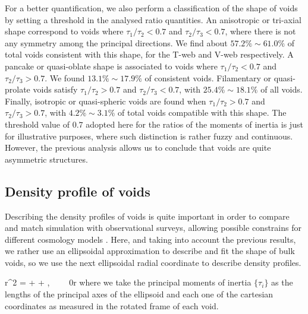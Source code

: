 \documentclass[a4,useAMS,usenatbib,usegraphicx]{latex/mn2e}
\begin{document}
For a better quantification, we also perform a classification of the shape 
of voids by setting a threshold in the analysed ratio quantities. An 
anisotropic or tri-axial shape correspond to voids where $\tau_1/\tau_2 < 
0.7$ and $\tau_2/\tau_3 < 0.7$, where there is not any symmetry among the
principal directions. We find about $57.2\% \sim 61.0\%$ of total voids 
consistent with this shape, for the T-web and V-web respectively. A 
pancake or quasi-oblate shape is associated to voids where $\tau_1/\tau_2 
< 0.7$ and $\tau_2/\tau_3 > 0.7$. We found $13.1\% \sim 17.9\%$ of 
consistent voids. Filamentary or quasi-prolate voids satisfy $\tau_1/\tau_2 
> 0.7$ and $\tau_2/\tau_3 < 0.7$, with $25.4\% \sim 18.1\%$ of all voids.
Finally, isotropic or quasi-spheric voids are found when $\tau_1/\tau_2 
> 0.7$ and $\tau_2/\tau_3 > 0.7$, with $4.2\% \sim 3.1\%$ of total voids 
compatible with this shape. The threshold value of $0.7$ adopted here for
the ratios of the moments of inertia is just for illustrative purposes, 
where such distinction is rather fuzzy and continuous. However, the 
previous analysis allows us to conclude that voids are quite asymmetric 
structures.



\subsection{Density profile of voids}
\label{subsec:density_voids}


Describing the density profiles of voids is quite important in order to 
compare and match simulation with observational surveys, allowing possible
constrains for different cosmology models \SRKED{[Hamaous, et.al 2014]}. 
Here, and taking into account the previous results, we rather use an 
ellipsoidal approximation to describe and fit the shape of bulk voids, so 
we use the next ellipsoidal radial coordinate to describe density profiles.


{
r^2 =  +  + ,
\ \ \ \ 0\leq r 
}
where we take the principal moments of inertia $\{\tau_i \}$ as the 
lengths of the principal axes of the ellipsoid and each one of the 
cartesian coordinates as measured in the rotated frame of each void.
\end{document}
